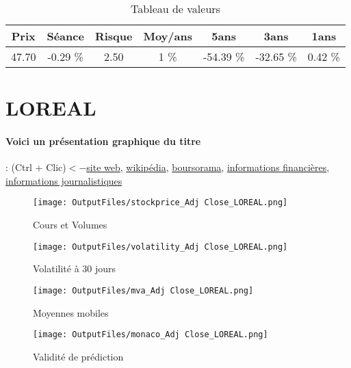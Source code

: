 \documentclass[11pt,a4paper]{report}%
\begin{document}
\begin{table}[H]
  \centering
    \begin{tabular}{|c|c|c|c|c|c|c|}
    \hline
    Prix & Séance & Risque  & Moy/ans & 5ans & 3ans & 1ans \\
    \hline
    47.70 &    -0.29 \%    & 2.50 & 1 \% & -54.39 \% & -32.65 \% & 0.42 \% \\
    \hline
    \end{tabular}%
        \label{tab:table_BIC}%
      \caption{Tableau de valeurs}
\end{table}%

\newpage

\section{LOREAL}

\paragraph{Voici un présentation graphique du titre} : (Ctrl + Clic)$<-$\href{https://www.loreal-finance.com/fr}{site web}, \href{https://fr.wikipedia.org/wiki/L%27Or%C3%A9al}{wikipédia}, \href{https://www.boursorama.com/cours/1rPOR}{boursorama}, \href{https://www.qwant.com/?q=site:https:%2f%2fwww.easybourse.com%2faction-societe%2fLOREAL&t=web&client=ext-firefox-hp}{informations financières}, \href{https://bourse.lerevenu.com/cours-de-bourse/fiche-valeur-synthese/LOREAL/OR-FR}{informations journalistiques}
\begin{figure}[!htb]
   \begin{minipage}{0.5\textwidth}
     \centering
     \texttt{[image: OutputFiles/stockprice\_Adj Close\_LOREAL.png]}
     \caption{Cours et Volumes}\label{Fig:price_LOREAL}
   \end{minipage}\hfill
   \begin{minipage}{0.5\textwidth}
     \centering
     \texttt{[image: OutputFiles/volatility\_Adj Close\_LOREAL.png]}
     \caption{Volatilité à 30 jours}\label{Fig:volat_LOREAL}
   \end{minipage}
\end{figure}
\begin{figure}[!htb]
   \begin{minipage}{0.5\textwidth}
     \centering
     \texttt{[image: OutputFiles/mva\_Adj Close\_LOREAL.png]}
     \caption{Moyennes mobiles}\label{Fig:mva_LOREAL}
   \end{minipage}\hfill
   \begin{minipage}{0.5\textwidth}
     \centering
     \texttt{[image: OutputFiles/monaco\_Adj Close\_LOREAL.png]}
     \caption{Validité de prédiction}\label{Fig:prediction_LOREAL}
   \end{minipage}
\end{figure}
\end{document}
